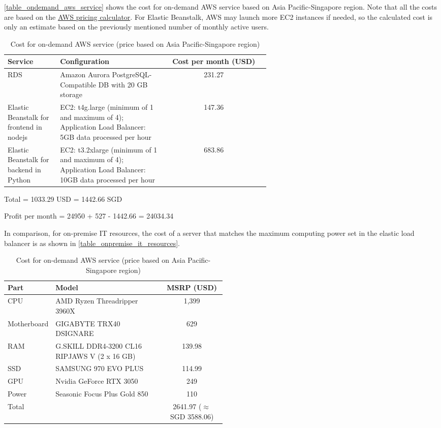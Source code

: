 \documentclass[12pt,a4paper]{article}
\begin{document}
\autoref{table_ondemand_aws_service} shows the cost for on-demand AWS service based on Asia Pacific-Singapore region. Note that all the costs are based on the \href{https://calculator.aws/#}{AWS pricing calculator}. For Elastic Beanstalk, AWS may launch more EC2 instances if needed, so the calculated cost is only an estimate based on the previously mentioned number of monthly active users.

\begin{table}[H]
	\centering
	\begin{tabular}{p{0.2\linewidth}|p{0.4\linewidth}|c}	%
	\hline \hline
	Service
	    & Configuration
	    & Cost per month (USD)\\
		\hline
	RDS
		& Amazon Aurora PostgreSQL-Compatible DB with 20 GB storage
		& 231.27 \\
	Elastic Beanstalk for frontend in nodejs
		& EC2: t4g.large (minimum of 1 and maximum of 4); Application Load Balancer: 5GB data processed per hour
		& 147.36 \\
	Elastic Beanstalk for backend in Python
	    & EC2: t3.2xlarge (minimum of 1 and maximum of 4); Application Load Balancer: 10GB data processed per hour
    	& 683.86 \\
	\hline \hline
	\end{tabular}
	\caption{Cost for on-demand AWS service (price based on Asia Pacific-Singapore region)}
	\label{table_ondemand_aws_service}
\end{table}

Total = 1033.29 USD = 1442.66 SGD

Profit per month = 24950 + 527 - 1442.66 = 24034.34

In comparison, for on-premise IT resources, the cost of a server that matches the maximum computing power set in the elastic load balancer is as shown in \autoref{table_onpremise_it_resources}.

\begin{table}[H]
	\centering
	\begin{tabular}{l|p{0.5\linewidth}|c}	%
	\hline \hline
	Part
	    & Model
	    & MSRP (USD)\\
		\hline
	CPU
		& AMD Ryzen Threadripper 3960X
		& 1,399 \\
	Motherboard
		& GIGABYTE TRX40 DSIGNARE
		& 629 \\
	RAM
	    & G.SKILL DDR4-3200 CL16 RIPJAWS V (2 x 16 GB)
    	& 139.98 \\
    SSD
        & SAMSUNG 970 EVO PLUS
        & 114.99 \\
    GPU
        & Nvidia GeForce RTX 3050
        & 249 \\
    Power
        & Seasonic Focus Plus Gold 850
        & 110 \\
    \hline
    Total
        &
        & 2641.97 ($\approx$ SGD 3588.06)\\
	\hline \hline
	\end{tabular}
	\caption{Cost for on-demand AWS service (price based on Asia Pacific-Singapore region)}
	\label{table_onpremise_it_resources}
\end{table}
\end{document}
